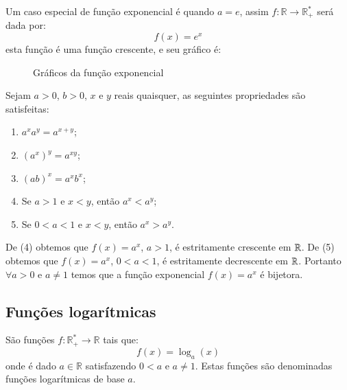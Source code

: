   Um caso especial de função exponencial é quando $a= e$, assim $f: \mathbb{R} \rightarrow \mathbb{R_{+}^{*}} $ será dada por:
  \[f(x) = e^x\]
  esta função é uma função crescente, e seu gráfico é:

  \begin{figure}[H]
 \centering
    \caption{Gráficos da função exponencial}
  \end{figure}

 Sejam $a > 0$, $b > 0$, $x$ e $y$ reais quaisquer, as seguintes propriedades são satisfeitas:
 \begin{enumerate}
  \item $a^x a^y= a^{x+y}$;
  \item $(a^x)^y= a^{xy}$;
  \item $(ab)^x= a^x b^x$;
  \item Se $a > 1$ e $x < y$, então $a^x < a^y$;
  \item Se $0 < a < 1$ e $x < y$, então $a^x > a^y$.
 \end{enumerate}

 De (4) obtemos que $f(x)= a^x$, $a > 1$, é estritamente crescente em $\mathbb{R}$. De (5) obtemos que $f(x)= a^x$, $0 < a < 1$, é estritamente decrescente em $\mathbb{R}$. Portanto $\forall a > 0$ e $a \neq 1$ temos que a função exponencial $f(x)= a^x$ é bijetora.


 \subsection{Funções logarítmicas}

 São funções $f: \mathbb{R_{+}^{*}} \rightarrow \mathbb{R} $ tais que:
 \[f(x) = \log_{a}(x)\]
 onde é dado $a \in \mathbb{R}$ satisfazendo $0 < a$ e $a \neq 1$. Estas funções são denominadas funções logarítmicas de base $a$.

